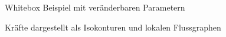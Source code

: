 \begin{figure}[ht!]
  \centering
  \caption{Whitebox Beispiel mit veränderbaren Parametern}
  \label{fig:whitebox}
\end{figure}

\begin{figure}[ht!]
  \centering
  \caption{Kräfte dargestellt als Isokonturen und lokalen Flussgraphen}
  \label{fig:isocon}
\end{figure}

